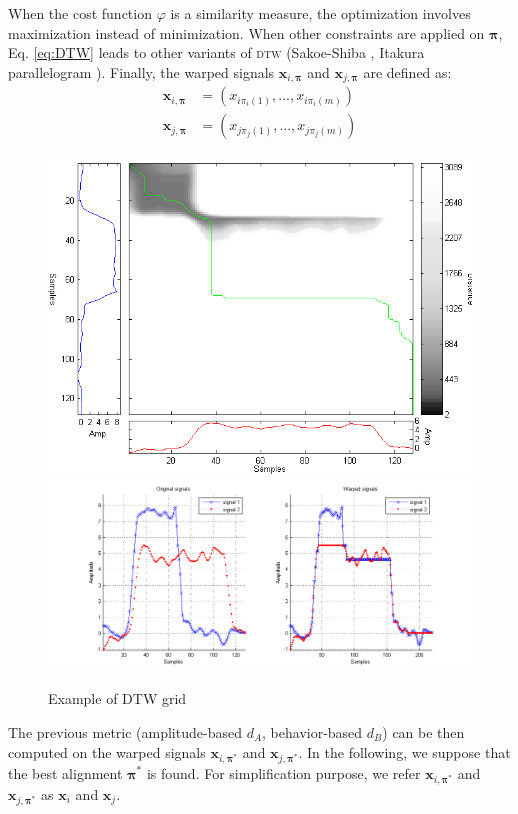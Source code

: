 \noindent When the cost function $\varphi$ is a similarity measure, the optimization involves maximization instead of minimization. When other constraints are applied on $\boldsymbol{\pi}$, Eq. \eqref{eq:DTW} leads to other variants of \textsc{dtw} (Sakoe-Shiba \cite{Sakoe1978a}, Itakura parallelogram \cite{Rabiner1993}). Finally, the warped signals $\textbf{x}_{i,\boldsymbol{\pi}}$ and $\textbf{x}_{j,\boldsymbol{\pi}}$ are defined as:
\begin{align}
\textbf{x}_{i,\boldsymbol{\pi}} 
&= (x_{i\pi_i(1)}, ..., 
x_{i\pi_i(m)}) 			\\	
\textbf{x}_{j,\boldsymbol{\pi}} 
&= (x_{j\pi_j(1)}, ..., 
x_{j\pi_j(m)}) 	
\end{align}

\begin{figure}[h!]
	\centering
	\includegraphics[width=0.5\linewidth]{images/DTWgrid2}
	\includegraphics[width=1\linewidth]{images/DTWwarpedSignals}
	\caption{Example of DTW grid}
	\label{fig:DTWgrid}
\end{figure}


The previous metric (amplitude-based $d_A$, behavior-based $d_B$) can be then computed on the warped signals $\textbf{x}_{i,\boldsymbol{\pi}^*}$ and $\textbf{x}_{j,\boldsymbol{\pi}^*}$. In the following, we suppose that the best alignment $\boldsymbol{\pi}^*$ is found. For simplification purpose, we refer $\textbf{x}_{i,\boldsymbol{\pi}^*}$ and $\textbf{x}_{j,\boldsymbol{\pi}^*}$ as $\textbf{x}_{i}$ and $\textbf{x}_{j}$. 

